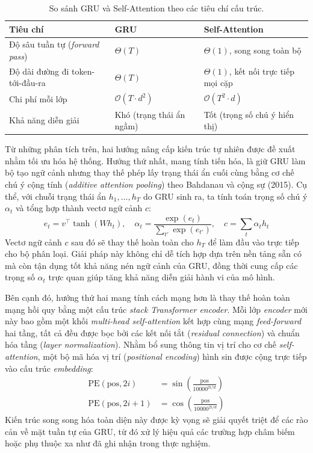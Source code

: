 \begin{table}[htbp]
\centering
\caption{So sánh GRU và Self-Attention theo các tiêu chí cấu trúc.}
\label{tab:so-sanh-gru-attention}
\begin{tabularx}{\textwidth}{l >{\raggedright\arraybackslash}X >{\raggedright\arraybackslash}X}
\toprule
\textbf{Tiêu chí} & \textbf{GRU} & \textbf{Self-Attention} \\ \midrule
Độ sâu tuần tự (\textit{forward pass}) & $\Theta(T)$ & $\Theta(1)$, song song toàn bộ \\ \addlinespace
Độ dài đường đi token-tới-đầu-ra & $\Theta(T)$ & $\Theta(1)$, kết nối trực tiếp mọi cặp \\ \addlinespace
Chi phí mỗi lớp & $\mathcal{O}(T \cdot d^2)$ & $\mathcal{O}(T^2 \cdot d)$ \\ \addlinespace
Khả năng diễn giải & Khó (trạng thái ẩn ngầm) & Tốt (trọng số chú ý hiển thị) \\ \bottomrule
\end{tabularx}
\end{table}

Từ những phân tích trên, hai hướng nâng cấp kiến trúc tự nhiên được đề xuất nhằm tối ưu hóa hệ thống. Hướng thứ nhất, mang tính tiến hóa, là giữ GRU làm bộ tạo ngữ cảnh nhưng thay thế phép lấy trạng thái ẩn cuối cùng bằng cơ chế chú ý cộng tính (\textit{additive attention pooling}) theo Bahdanau và cộng sự (2015). Cụ thể, với chuỗi trạng thái ẩn $h_1, \dots, h_T$ do GRU sinh ra, ta tính toán trọng số chú ý $\alpha_t$ và tổng hợp thành vectơ ngữ cảnh $c$:
\begin{equation}
e_t = v^\top \tanh(W h_t), \quad \alpha_t = \frac{\exp(e_t)}{\sum_{t'} \exp(e_{t'})}, \quad c = \sum_{t} \alpha_t h_t
\end{equation}
Vectơ ngữ cảnh $c$ sau đó sẽ thay thế hoàn toàn cho $h_T$ để làm đầu vào trực tiếp cho bộ phân loại. Giải pháp này không chỉ dễ tích hợp dựa trên nền tảng sẵn có mà còn tận dụng tốt khả năng nén ngữ cảnh của GRU, đồng thời cung cấp các trọng số $\alpha_t$ trực quan giúp tăng khả năng diễn giải hành vi của mô hình.

Bên cạnh đó, hướng thứ hai mang tính cách mạng hơn là thay thế hoàn toàn mạng hồi quy bằng một cấu trúc \textit{stack Transformer encoder}. Mỗi lớp \textit{encoder} mới này bao gồm một khối \textit{multi-head self-attention} kết hợp cùng mạng \textit{feed-forward} hai tầng, tất cả đều được bọc bởi các kết nối tắt (\textit{residual connection}) và chuẩn hóa tầng (\textit{layer normalization}). Nhằm bổ sung thông tin vị trí cho cơ chế \textit{self-attention}, một bộ mã hóa vị trí (\textit{positional encoding}) hình sin được cộng trực tiếp vào cấu trúc \textit{embedding}:
\begin{align}
\text{PE}(\text{pos}, 2i) &= \sin\left( \frac{\text{pos}}{10000^{2i/d}} \right) \\
\text{PE}(\text{pos}, 2i+1) &= \cos\left( \frac{\text{pos}}{10000^{2i/d}} \right)
\end{align}
Kiến trúc song song hóa toàn diện này được kỳ vọng sẽ giải quyết triệt để các rào cản về mặt tuần tự của GRU, từ đó xử lý hiệu quả các trường hợp châm biếm hoặc phụ thuộc xa như đã ghi nhận trong thực nghiệm.